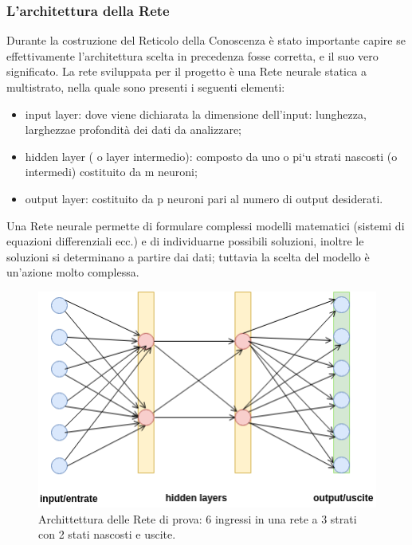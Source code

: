 \subsubsection{L'architettura della Rete}
\label{L'architettura della Rete}
Durante la costruzione del Reticolo della Conoscenza \`e stato importante capire se effettivamente l'architettura scelta in precedenza fosse corretta, e il suo vero significato. La rete sviluppata per il progetto \`e una Rete neurale statica a multistrato, nella quale sono presenti i seguenti elementi:
\begin{itemize}
\item input layer: dove viene dichiarata la dimensione dell'input: lunghezza, larghezzae profondit\`a dei dati da analizzare;
\item hidden layer ( o layer intermedio): composto da uno o pi`u strati nascosti (o intermedi) costituito da m neuroni;
\item output layer:  costituito da p neuroni pari al numero di output desiderati.
\end{itemize}
\noindent 
Una Rete neurale permette di formulare complessi modelli matematici (sistemi di equazioni differenziali ecc.) e di individuarne possibili soluzioni, inoltre le soluzioni si determinano a partire dai dati; tuttavia la scelta del modello \`e un'azione molto complessa.

\noindent
\begin{figure}[H]
\centering
	\includegraphics[width=0.60\linewidth]{./image/architettua-rete-prova.png}
	\caption{Archittettura delle Rete di prova: 6 ingressi in una rete a 3 strati con 2 stati nascosti e uscite.}
	\label{Archittettura delle Rete di prova: 6 ingressi in una rete a 3 strati con 2 stati nascosti e uscite.}
\end{figure}
\noindent



